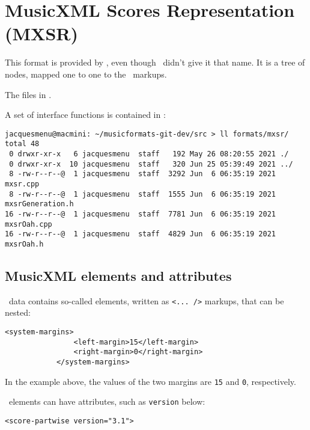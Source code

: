 
\chapter{MusicXML Scores Representation (MXSR)}

This format is provided by \libmusicxml, even though \fober\ didn't give it that name. It is a tree of  nodes, mapped one to one to the \mxml\ markups.

The files in .

A set of interface functions is contained in :
\begin{lstlisting}[language=Terminal]
jacquesmenu@macmini: ~/musicformats-git-dev/src > ll formats/mxsr/
total 48
 0 drwxr-xr-x   6 jacquesmenu  staff   192 May 26 08:20:55 2021 ./
 0 drwxr-xr-x  10 jacquesmenu  staff   320 Jun 25 05:39:49 2021 ../
 8 -rw-r--r--@  1 jacquesmenu  staff  3292 Jun  6 06:35:19 2021 mxsr.cpp
 8 -rw-r--r--@  1 jacquesmenu  staff  1555 Jun  6 06:35:19 2021 mxsrGeneration.h
16 -rw-r--r--@  1 jacquesmenu  staff  7781 Jun  6 06:35:19 2021 mxsrOah.cpp
16 -rw-r--r--@  1 jacquesmenu  staff  4829 Jun  6 06:35:19 2021 mxsrOah.h
\end{lstlisting}


\section{MusicXML elements and attributes}

\mxml\ data contains so-called elements, written as {\tt <...~/>} markups, that can be nested:
\begin{lstlisting}[language=MusicXML]
			<system-margins>
				<left-margin>15</left-margin>
				<right-margin>0</right-margin>
			</system-margins>
\end{lstlisting}
In the example above, the values of the two margins are {\tt 15} and {\tt 0}, respectively.

\mxml\ elements can have attributes, such as {\tt version} below:
\begin{lstlisting}[language=MusicXML]
<score-partwise version="3.1">
\end{lstlisting}

